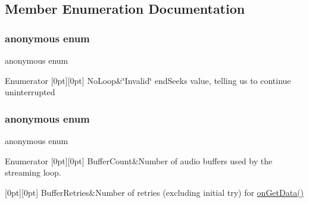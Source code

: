 \subsection{Member Enumeration Documentation}
\mbox{\label{classsf_1_1_sound_stream_a7707214e7cd4ffcf1c123e7bcab4092a}} 
\subsubsection{\texorpdfstring{anonymous enum}{anonymous enum}}
{\footnotesize\ttfamily anonymous enum\hspace{0.3cm}{\ttfamily [protected]}}

\begin{DoxyEnumFields}{Enumerator}
[0pt][0pt]{}\mbox{\label{classsf_1_1_sound_stream_a7707214e7cd4ffcf1c123e7bcab4092aa2f2c638731fdff0d6fe4e3e82b6f6146}} 
No\+Loop&\char`\"{}\+Invalid\char`\"{} end\+Seeks value, telling us to continue uninterrupted \\
\hline

\end{DoxyEnumFields}
\mbox{\label{classsf_1_1_sound_stream_a2419ce94e45f7d4d0302b7963282c40c}} 
\subsubsection{\texorpdfstring{anonymous enum}{anonymous enum}}
{\footnotesize\ttfamily anonymous enum\hspace{0.3cm}{\ttfamily [private]}}

\begin{DoxyEnumFields}{Enumerator}
[0pt][0pt]{}\mbox{\label{classsf_1_1_sound_stream_a2419ce94e45f7d4d0302b7963282c40ca3adf3b6cd18edb6121fda81e569dbbf5}} 
Buffer\+Count&Number of audio buffers used by the streaming loop. \\
\hline

[0pt][0pt]{}\mbox{\label{classsf_1_1_sound_stream_a2419ce94e45f7d4d0302b7963282c40ca44b14ec3fd6194cf72c8fecef516f98b}} 
Buffer\+Retries&Number of retries (excluding initial try) for \mbox{\hyperlink{classsf_1_1_sound_stream_a968ec024a6e45490962c8a1121cb7c5f}{on\+Get\+Data()}} \\
\hline

\end{DoxyEnumFields}


